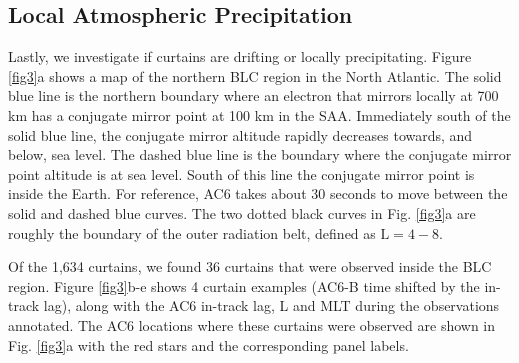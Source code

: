 \documentclass[draft]{agujournal2019}
\begin{document}
\subsection{Local Atmospheric Precipitation}
Lastly, we investigate if curtains are drifting or locally precipitating. Figure \ref{fig3}a shows a map of the northern BLC region in the North Atlantic. The solid blue line is the northern boundary where an electron that mirrors locally at 700 km has a conjugate mirror point at 100 km in the SAA. Immediately south of the solid blue line, the conjugate mirror altitude rapidly decreases towards, and below, sea level. The dashed blue line is the boundary where the conjugate mirror point altitude is at sea level. South of this line the conjugate mirror point is inside the Earth. For reference, AC6 takes about 30 seconds to move between the solid and dashed blue curves. The two dotted black curves in Fig. \ref{fig3}a are roughly the boundary of the outer radiation belt, defined as $\mathrm{L}=4-8$.

Of the 1,634 curtains, we found 36 curtains that were observed inside the BLC region. Figure \ref{fig3}b-e shows 4 curtain examples (AC6-B time shifted by the in-track lag), along with the AC6 in-track lag, L and MLT during the observations annotated. The AC6 locations where these curtains were observed are shown in Fig. \ref{fig3}a with the red stars and the corresponding panel labels.
\end{document}
